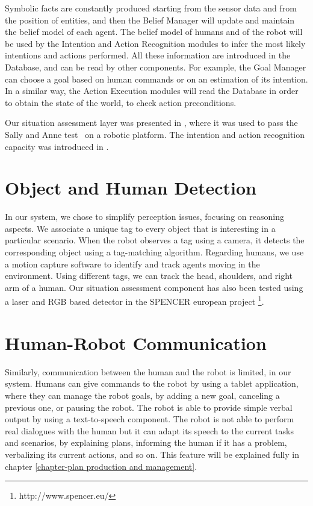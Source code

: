 Symbolic facts are constantly produced starting from the sensor data and from the position of entities, and then the Belief Manager will update and maintain the belief model of each agent. The belief model of humans and of the robot will be used by the Intention and Action Recognition modules to infer the most likely intentions and actions performed. All these information are introduced in the Database, and can be read by other components. For example, the Goal Manager can choose a goal based on human commands or on an estimation of its intention. In a similar way, the Action Execution modules will read the Database in order to obtain the state of the world, to check action preconditions.  

Our situation assessment layer was presented in \cite{Milliez2014}, where it was used to pass the Sally and Anne test~\cite{Baron1985} on a robotic platform. The intention and action recognition capacity was introduced in \cite{devin2016some}.

\section{Object and Human Detection}
In our system, we chose to simplify perception issues, focusing on reasoning aspects. We associate a unique tag to every object that is interesting in a particular scenario.  When the robot observes a tag using a camera, it detects the corresponding object using a tag-matching algorithm.
Regarding humans, we use a motion capture software to identify and track agents moving in the environment. Using different tags, we can track the head, shoulders, and right arm of a human. Our situation assessment component has also been tested using a laser and RGB based detector in the SPENCER european project \footnote{http://www.spencer.eu/}.

\section{Human-Robot Communication}
Similarly, communication between the human and the robot is limited, in our system. Humans can give commands to the robot by using a tablet application, where they can manage the robot goals, by adding a new goal, canceling a previous one, or pausing the robot. The robot is able to provide simple verbal output by using a text-to-speech component. The robot is not able to perform real dialogues with the human but it can adapt its speech to the current tasks and scenarios, by explaining plans, informing the human if it has a problem, verbalizing its current actions, and so on. This feature will be explained fully in chapter \ref{chapter-plan production and management}. 

